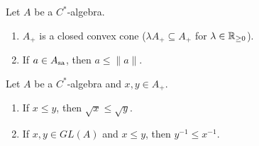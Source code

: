 \begin{corollary}
  Let $A$ be a $C^*$-algebra.
  \begin{enumerate}
    \item $A_+$ is a closed convex cone ($\lambda A_+ \subseteq A_+$ for $\lambda \in \mathbb {R}_{\geq 0}$).
    \item If $a \in A_{\operatorname{sa}}$, then $a \leq \|a\|$.
  \end{enumerate}
\end{corollary}

\begin{proposition}
  Let $A$ be a $C^*$-algebra and $x, y \in A_+$.
  \begin{enumerate}
    \item If $x \leq y$, then $\sqrt{x} \leq \sqrt{y}$.
    \item If $x, y \in GL(A)$ and $x \leq y$, then $y^{-1} \leq x^{-1}$.
  \end{enumerate}
\end{proposition}


